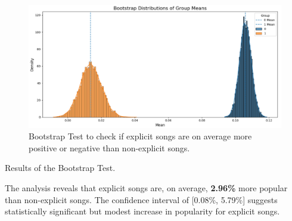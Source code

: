\begin{center}
\begin{figure}[H]
  \centering
  \includegraphics[width=5in]{img/explicitness_bootstrap_2.png}
  \caption{Bootstrap Test to check if explicit songs are on average more
  positive or negative than non-explicit songs.}
  \label{Figure:fig_bh}
\end{figure}
\end{center}



\begin{table}[H]
\centering
\caption{Results of the Bootstrap Test.}
\end{table}

The analysis reveals that explicit songs are, on average, \textbf{2.96\%} more
popular than non-explicit songs. The confidence interval of [0.08\%, 5.79\%]
suggests statistically significant but modest increase in popularity for
explicit songs.

